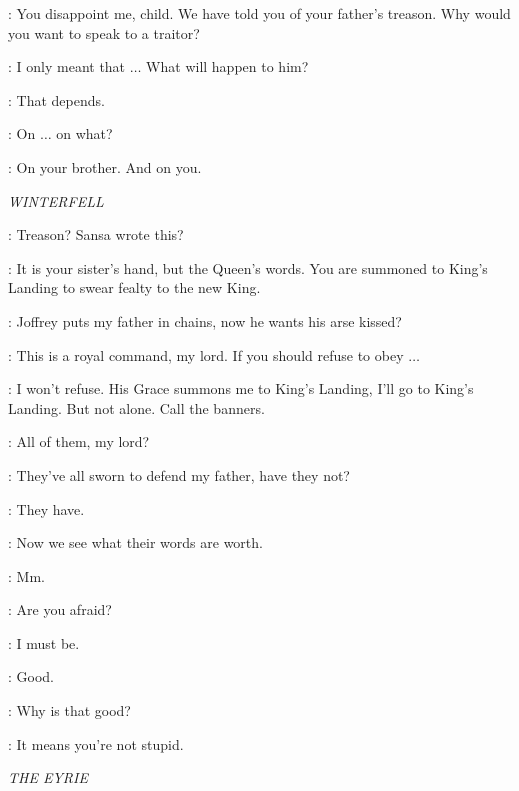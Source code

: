 \CERSEI: You disappoint me, child. We have told you of your father's treason. Why would you want to speak to a traitor? 

\SANSA: I only meant that $\ldots$ What will happen to him? 

\CERSEI: That depends. 

\SANSA: On $\ldots$ on what? 

\CERSEI: On your brother. And on you. 


\scene

\textit{WINTERFELL} 


\ROBB:  Treason? Sansa wrote this? 

\LUWIN: It is your sister's hand, but the Queen's words. You are summoned to King's Landing to swear fealty to the new King. 

\ROBB: Joffrey puts my father in chains, now he wants his arse kissed? 

\LUWIN: This is a royal command, my lord. If you should refuse to obey $\ldots$

\ROBB: I won't refuse. His Grace summons me to King's Landing, I'll go to King's Landing. But not alone. Call the banners. 

\LUWIN: All of them, my lord? 

\ROBB: They've all sworn to defend my father, have they not? 

\LUWIN: They have. 

\ROBB: Now we see what their words are worth. 

\LUWIN: Mm.


\THEON: Are you afraid? 


\ROBB: I must be. 

\THEON: Good. 

\ROBB: Why is that good? 

\THEON: It means you're not stupid. 



\scene

\textit{THE EYRIE} 


